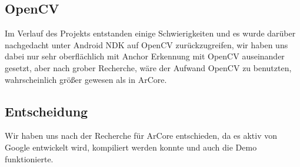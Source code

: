 \subsection{OpenCV}
Im Verlauf des Projekts entstanden einige Schwierigkeiten und es wurde darüber nachgedacht
unter Android NDK\cite{android_ndk} auf OpenCV\cite{openCV} zurückzugreifen, wir haben uns dabei nur sehr oberflächlich
mit Anchor Erkennung mit OpenCV auseinander gesetzt, aber nach grober Recherche, wäre der
Aufwand OpenCV zu benutzten, wahrscheinlich größer gewesen als in ArCore.

\subsection{Entscheidung}
Wir haben uns nach der Recherche für ArCore\cite{ar_core} entschieden, da es aktiv von Google entwickelt
wird, kompiliert werden konnte und auch die Demo funktionierte.
